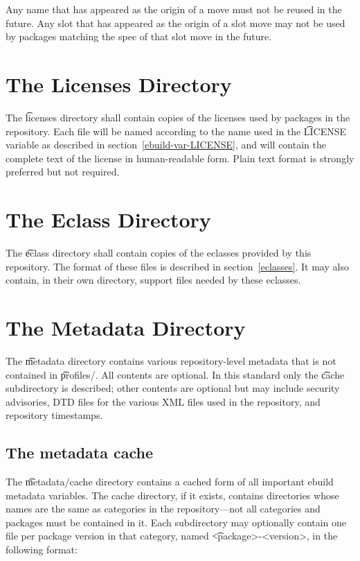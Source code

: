 Any name that has appeared as the origin of a move must not be reused in the future. Any slot
that has appeared as the origin of a slot move may not be used by packages matching the spec of
that slot move in the future.

\section{The Licenses Directory}
\label{licenses-dir}

The \t{licenses} directory shall contain copies of the licenses used by packages in the
repository. Each file will be named according to the name used in the \t{LICENSE} variable as
described in section~\ref{ebuild-var-LICENSE}, and will contain the complete text of the license in
human-readable form. Plain text format is strongly preferred but not required.

\section{The Eclass Directory}
\label{eclass-dir}

The \t{eclass} directory shall contain copies of the eclasses provided by this repository. The
format of these files is described in section~\ref{eclasses}. It may also contain, in their own
directory, support files needed by these eclasses.

\section{The Metadata Directory}
\label{metadata-dir}

The \t{metadata} directory contains various repository-level metadata that is not contained in
\t{profiles/}. All contents are optional. In this standard only the \t{cache} subdirectory is
described; other contents are optional but may include security advisories, DTD files for the
various XML files used in the repository, and repository timestamps.

\subsection{The metadata cache}

The \t{metadata/cache} directory contains a cached form of all important ebuild metadata variables.
The cache directory, if it exists, contains directories whose names are the same as categories in
the repository---not all categories and packages must be contained in it. Each subdirectory may
optionally contain one file per package version in that category, named \t{<package>-<version>},
in the following format:

